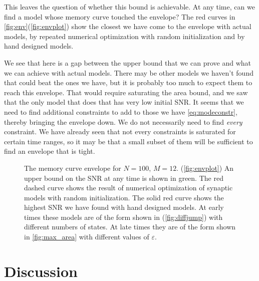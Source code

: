 \documentclass{article} %
\begin{document}
This leaves the question of whether this bound is achievable.
At any time, can we find a model whose memory curve touched the envelope?
The red curves in \autoref{fig:env}(\ref{fig:envplot}) show the closest we have come to the envelope with actual models, by repeated numerical optimization with random initialization and by hand designed models.

We see that here is a gap between the upper bound that we can prove and what we can achieve with actual models.
There may be other models we haven't found that could beat the ones we have, but it is probably too much to expect them to reach this envelope.
That would require saturating the area bound, and we saw that the only model that does that has very low initial SNR.
It seems that we need to find additional constraints to add to those we have \eqref{eq:modeconstr}, thereby bringing the envelope down.
We do not necessarily need to find \emph{every} constraint.
We have already seen that not every constraints is saturated for certain time ranges, so it may be that a small subset of them will be sufficient to find an envelope that is tight.






\begin{figure}
 \begin{center}
 \begin{myenuma}
  \item{}\label{fig:envplot}\hp
  \item{}\label{fig:diffjump}
 \end{myenuma}
 \end{center}
  \caption{The memory curve envelope for $N=100$, $M=12$.
  (\ref{fig:envplot}) An upper bound on the SNR at any time is shown in green.
  The red dashed curve shows the result of numerical optimization of synaptic models with random initialization.
  The solid red curve shows the highest SNR we have found with hand designed models.
  At early times these models are of the form shown in (\ref{fig:diffjump}) with different numbers of states.
  At late times they are of the form shown in \autoref{fig:max_area} with different values of $\varepsilon$.
  }\label{fig:env}
\end{figure}







\section{Discussion}\label{sec:disc}










\end{document}
